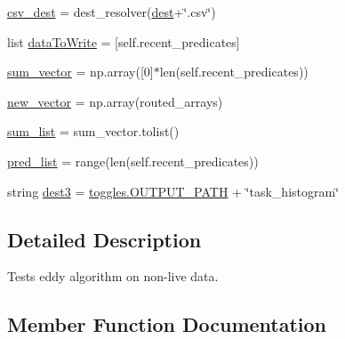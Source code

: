 \begin{DoxyCompactItemize}
\hyperlink{classdynamicfilterapp_1_1test__simulations_1_1_simulation_test_a6eed7f11544aaf90c0880db171d103a6}{csv\+\_\+dest} = dest\+\_\+resolver(\hyperlink{classdynamicfilterapp_1_1test__simulations_1_1_simulation_test_a66d4da94e0e4f717ff3e7f23c53f7c2d}{dest}+\char`\"{}.csv\char`\"{})
\item 
list \hyperlink{classdynamicfilterapp_1_1test__simulations_1_1_simulation_test_a213f043d9f337910e40da2aac8b37a87}{data\+To\+Write} = \mbox{[}self.\+recent\+\_\+predicates\mbox{]}
\item 
\hyperlink{classdynamicfilterapp_1_1test__simulations_1_1_simulation_test_a418948863130332c47bda07a24a9866f}{sum\+\_\+vector} = np.\+array(\mbox{[}0\mbox{]}$\ast$len(self.\+recent\+\_\+predicates))
\item 
\hyperlink{classdynamicfilterapp_1_1test__simulations_1_1_simulation_test_afadfad23c54c2616cbe6bff430f72e5b}{new\+\_\+vector} = np.\+array(routed\+\_\+arrays)
\item 
\hyperlink{classdynamicfilterapp_1_1test__simulations_1_1_simulation_test_af26c236cdeca420e57950e94386ca3c3}{sum\+\_\+list} = sum\+\_\+vector.\+tolist()
\item 
\hyperlink{classdynamicfilterapp_1_1test__simulations_1_1_simulation_test_a9ecbfebeaf51a31cbe46c8ce7814e330}{pred\+\_\+list} = range(len(self.\+recent\+\_\+predicates))
\item 
string \hyperlink{classdynamicfilterapp_1_1test__simulations_1_1_simulation_test_a8e2377aa159f703f8480b3cdce41e396}{dest3} = \hyperlink{namespacedynamicfilterapp_1_1toggles_a04644ded1d5e3fc8bd58a411209b7886}{toggles.\+O\+U\+T\+P\+U\+T\+\_\+\+P\+A\+TH} + \char`\"{}task\+\_\+histogram\char`\"{}
\end{DoxyCompactItemize}


\subsection{Detailed Description}
\begin{DoxyVerb}Tests eddy algorithm on non-live data.
\end{DoxyVerb}
 

\subsection{Member Function Documentation}
\mbox{\label{classdynamicfilterapp_1_1test__simulations_1_1_simulation_test_a1e7e4ad765387840293e282eaf2b20bf}} 
